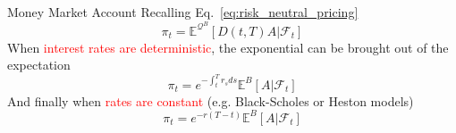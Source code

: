 \documentclass{beamer}
\begin{document}
\begin{frame}{Money Market Account}
    Recalling Eq.~\ref{eq:risk_neutral_pricing}
    \begin{equation*}
    	\pi_t = \mathbb{E}^{\mathcal{Q}^B}[D(t,T)A|\mathcal{F}_t]
    \end{equation*}
	When \textcolor{red}{interest rates are deterministic}, the exponential can be brought out of the expectation
	\begin{equation*}
		\pi_t = e^{-\int_t^T r_s ds} \mathbb{E}^B\left[A|\mathcal{F}_t\right]
	\end{equation*}
	And finally when \textcolor{red}{rates are constant} (e.g. Black-Scholes or Heston models)
	\begin{equation*}
		\pi_t = e^{-r(T-t)}\mathbb{E}^B\left[A|\mathcal{F}_t\right]
	\end{equation*}
\end{frame}
\end{document}
